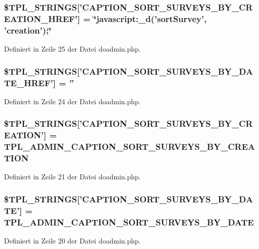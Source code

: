 \subsubsection{\setlength{\rightskip}{0pt plus 5cm}\$TPL\_\-STRINGS['CAPTION\_\-SORT\_\-SURVEYS\_\-BY\_\-CREATION\_\-HREF'] = \char`\"{}javascript:\_\-d('sortSurvey', 'creation');\char`\"{}}\label{doadmin_8php_bd2d01a122f74aecc4c96df2874be9cf}




Definiert in Zeile 25 der Datei doadmin.php.
\subsubsection{\setlength{\rightskip}{0pt plus 5cm}\$TPL\_\-STRINGS['CAPTION\_\-SORT\_\-SURVEYS\_\-BY\_\-DATE\_\-HREF'] = ''}\label{doadmin_8php_3f2c702d2b477122377566d7af8bab35}




Definiert in Zeile 24 der Datei doadmin.php.
\subsubsection{\setlength{\rightskip}{0pt plus 5cm}\$TPL\_\-STRINGS['CAPTION\_\-SORT\_\-SURVEYS\_\-BY\_\-CREATION'] = {\bf TPL\_\-ADMIN\_\-CAPTION\_\-SORT\_\-SURVEYS\_\-BY\_\-CREATION}}\label{doadmin_8php_67aeca80b1e96280795838ebd61aa624}




Definiert in Zeile 21 der Datei doadmin.php.
\subsubsection{\setlength{\rightskip}{0pt plus 5cm}\$TPL\_\-STRINGS['CAPTION\_\-SORT\_\-SURVEYS\_\-BY\_\-DATE'] = {\bf TPL\_\-ADMIN\_\-CAPTION\_\-SORT\_\-SURVEYS\_\-BY\_\-DATE}}\label{doadmin_8php_f7bf88f493ee13a399ae2c43b2214eb6}




Definiert in Zeile 20 der Datei doadmin.php.
